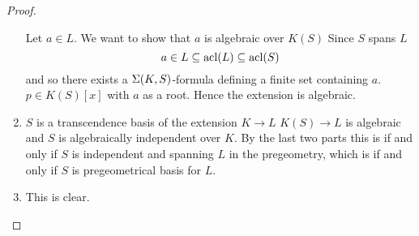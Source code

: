 \begin{proof}
\begin{enumerate}
        \begin{backward}
            Let $a \in L$.
            We want to show that $a$ is algebraic over $K(S)$
            Since $S$ spans $L$
            \[a \in L \subseteq \operatorname{acl}(L) \subseteq \operatorname{acl}(S)\]
            and so there exists a $\Sigma(K,S)$-formula defining a finite set 
            containing $a$.
             $p \in K(S)[x]$ with $a$ as a root.
            Hence the extension is algebraic.
        \end{backward}

        \item
            $S$ is a transcendence basis of the extension $K \to L$ 
            $K(S) \to L$ is algebraic and $S$ is 
            algebraically independent over $K$.
            By the last two parts this is if and only if $S$ is independent 
            and spanning $L$ in the pregeometry, 
            which is if and only if $S$ is pregeometrical basis for $L$.
        
        \item This is clear.
    \end{enumerate}
\end{proof}

